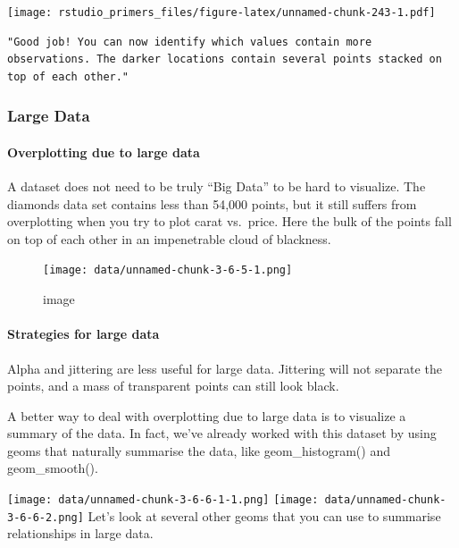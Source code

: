 \documentclass[
]{article}
\begin{document}
\texttt{[image: rstudio\_primers\_files/figure-latex/unnamed-chunk-243-1.pdf]}

\begin{verbatim}
"Good job! You can now identify which values contain more observations. The darker locations contain several points stacked on top of each other."
\end{verbatim}

\hypertarget{large-data}{%
\subsubsection{Large Data}\label{large-data}}

\hypertarget{overplotting-due-to-large-data}{%
\paragraph{Overplotting due to large
data}\label{overplotting-due-to-large-data}}

A dataset does not need to be truly ``Big Data'' to be hard to
visualize. The diamonds data set contains less than 54,000 points, but
it still suffers from overplotting when you try to plot carat vs.~price.
Here the bulk of the points fall on top of each other in an impenetrable
cloud of blackness.

\begin{figure}
\centering
\texttt{[image: data/unnamed-chunk-3-6-5-1.png]}
\caption{image}
\end{figure}

\hypertarget{strategies-for-large-data}{%
\paragraph{Strategies for large data}\label{strategies-for-large-data}}

Alpha and jittering are less useful for large data. Jittering will not
separate the points, and a mass of transparent points can still look
black.

A better way to deal with overplotting due to large data is to visualize
a summary of the data. In fact, we've already worked with this dataset
by using geoms that naturally summarise the data, like geom\_histogram()
and geom\_smooth().

\texttt{[image: data/unnamed-chunk-3-6-6-1-1.png]}
\texttt{[image: data/unnamed-chunk-3-6-6-2.png]} Let's look at several
other geoms that you can use to summarise relationships in large data.
\end{document}
